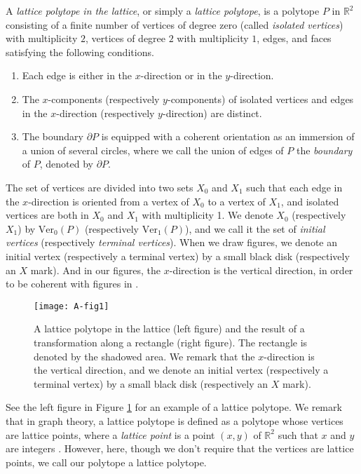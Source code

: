 \documentclass[a4paper,11pt]{amsart}
\numberwithin{equation}{section}
\begin{document}
\begin{definition}
A {\it lattice polytope in the lattice}, or simply a {\it lattice polytope}, is a polytope $P$ in $\mathbb{R}^2$ consisting of a finite number of vertices of degree zero (called {\it isolated vertices}) with multiplicity $2$, vertices of degree $2$ with multiplicity $1$, edges, and faces satisfying the following conditions. 

\begin{enumerate}[$(1)$]
\item
Each edge is either in the $x$-direction or in the $y$-direction. 

\item
The $x$-components (respectively $y$-components) of isolated vertices and edges in the $x$-direction (respectively $y$-direction)  are distinct. 

\item
The boundary $\partial P$ is equipped with a coherent orientation as an immersion of a union of several circles, where we call the union of edges of $P$ the {\it boundary} of $P$, denoted by $\partial P$. 
\end{enumerate}
 
The set of vertices are divided into two sets $X_0$ and $X_1$ 
such that each edge in the $x$-direction is oriented from a vertex of $X_0$ to a vertex of $X_1$, and isolated vertices are both in $X_0$ and $X_1$ with multiplicity 1. We denote $X_0$ (respectively $X_1$) by $\mathrm{Ver}_0(P)$ (respectively $\mathrm{Ver}_1(P)$), and we call it the set of {\it initial vertices} (respectively {\it terminal vertices}). 
When we draw figures, we denote an initial vertex (respectively a terminal vertex) by a small black disk (respectively an $X$ mark). And in our figures, the $x$-direction is the vertical direction, in order to be coherent with figures in \cite{N}. 
\end{definition}
%
\begin{figure}[ht]
\centering
\texttt{[image: A-fig1]}
\caption{A lattice polytope in the lattice (left figure) and the result of a transformation along a rectangle (right figure). The rectangle is denoted by the shadowed area. We remark that the $x$-direction is the vertical direction, and we denote an initial vertex (respectively a terminal vertex) by a small black disk (respectively an $X$ mark). }
\label{Fig1}
\end{figure}
%

 See the left figure in Figure \ref{Fig1} for an example of a lattice polytope. We remark that in graph theory, a lattice polytope is defined as a polytope whose vertices are lattice points, where a {\it lattice point} is a point $(x,y)$ of $\mathbb{R}^2$ such that $x$ and $y$ are integers \cite{Barvinok2, Diestel}. However, here, though we don't require that the vertices are lattice points, we call our polytope a lattice polytope. 
\end{document}
